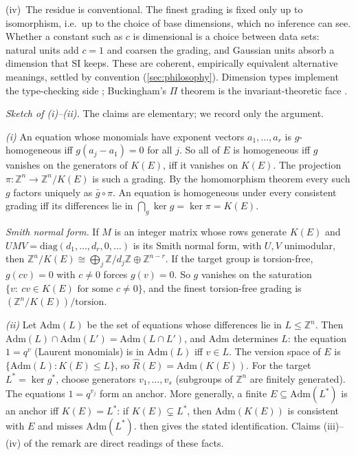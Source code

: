 \begin{remark}
(iv)~The residue is conventional. The finest grading is fixed only up to isomorphism, i.e.\ up to the choice of base dimensions, which no inference can see. Whether a constant such as $c$ is dimensional is a choice between data sets: natural units add $c=1$ and coarsen the grading, and Gaussian units absorb a dimension that SI keeps. These are coherent, empirically equivalent alternative meanings, settled by convention (\cref{sec:philosophy}).
Dimension types implement the type-checking side \citep{kennedy1994dimension}; Buckingham's $\Pi$ theorem is the invariant-theoretic face \citep{buckingham1914physically}.
\end{remark}

\noindent\emph{Sketch of (i)--(ii).} The claims are elementary; we record only the argument.

\emph{(i)} An equation whose monomials have exponent vectors $a_1,\dots,a_r$ is $g$-homogeneous iff $g(a_j-a_1)=0$ for all $j$. So all of $E$ is homogeneous iff $g$ vanishes on the generators of $K(E)$, iff it vanishes on $K(E)$. The projection $\pi:\mathbb Z^n\to\mathbb Z^n/K(E)$ is such a grading. By the homomorphism theorem every such $g$ factors uniquely as $\bar g\circ\pi$. An equation is homogeneous under every consistent grading iff its differences lie in $\bigcap_g\ker g=\ker\pi=K(E)$.

\emph{Smith normal form.} If $M$ is an integer matrix whose rows generate $K(E)$ and $UMV=\mathrm{diag}(d_1,\dots,d_r,0,\dots)$ is its Smith normal form, with $U,V$ unimodular, then $\mathbb Z^n/K(E)\cong\bigoplus_j\mathbb Z/d_j\mathbb Z\oplus\mathbb Z^{n-r}$. If the target group is torsion-free, $g(cv)=0$ with $c\neq0$ forces $g(v)=0$. So $g$ vanishes on the saturation $\{v:\ cv\in K(E)\text{ for some }c\neq0\}$, and the finest torsion-free grading is $(\mathbb Z^n/K(E))/\mathrm{torsion}$.

\emph{(ii)} Let $\mathrm{Adm}(L)$ be the set of equations whose differences lie in $L\le\mathbb Z^n$. Then $\mathrm{Adm}(L)\cap\mathrm{Adm}(L')=\mathrm{Adm}(L\cap L')$, and $\mathrm{Adm}$ determines $L$: the equation $1=q^v$ (Laurent monomials) is in $\mathrm{Adm}(L)$ iff $v\in L$. The version space of $E$ is $\{\mathrm{Adm}(L):K(E)\le L\}$, so $\hat R(E)=\mathrm{Adm}(K(E))$. For the target $L^*=\ker g^*$, choose generators $v_1,\dots,v_s$ (subgroups of $\mathbb Z^n$ are finitely generated). The equations $1=q^{v_j}$ form an anchor. More generally, a finite $E\subseteq\mathrm{Adm}(L^*)$ is an anchor iff $K(E)=L^*$: if $K(E)\subsetneq L^*$, then $\mathrm{Adm}(K(E))$ is consistent with $E$ and misses $\mathrm{Adm}(L^*)$.  then gives the stated identification. Claims (iii)--(iv) of the remark are direct readings of these facts.


